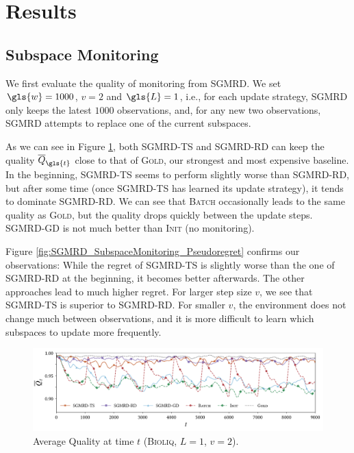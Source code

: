 \section{Results}

\subsection{Subspace Monitoring}

We first evaluate the quality of monitoring from \gls{SGMRD}. We set $\gls{w}=1000$, $v=2$ and $\gls{L}=1$, i.e., for each update strategy, \gls{SGMRD} only keeps the latest $1000$ observations, and, for any new two observations, 
\gls{SGMRD} attempts to replace one of the current subspaces. 

As we can see in Figure \ref{fig:SGMRD_SubspaceMonitoring_Quality}, both \textsc{\gls{SGMRD}-\gls{TS}} and \textsc{\gls{SGMRD}-RD} can keep the quality $\overline{Q}_{\gls{t}}$ close to that of \textsc{Gold}, our strongest and most expensive baseline. 
In the beginning, \textsc{\gls{SGMRD}-\gls{TS}} seems to perform slightly worse than \textsc{\gls{SGMRD}-RD}, but after some time (once \textsc{\gls{SGMRD}-\gls{TS}} has learned its update strategy), it tends to dominate \textsc{\gls{SGMRD}-RD}. 
We can see that \textsc{Batch} occasionally leads to the same quality as \textsc{Gold}, but the quality drops quickly between the update steps. 
\textsc{\gls{SGMRD}-GD} is not much better than \textsc{Init} (no monitoring). 

Figure \ref{fig:SGMRD_SubspaceMonitoring_Pseudoregret} confirms our observations: While the regret of \textsc{\gls{SGMRD}-\gls{TS}} is slightly worse than the one of \textsc{\gls{SGMRD}-RD} at the beginning, it becomes better afterwards. 
The other approaches lead to much higher regret. 
For larger step size $v$, we see that \textsc{\gls{SGMRD}-\gls{TS}} is superior to \textsc{\gls{SGMRD}-RD}. %
For smaller $v$, the environment does not change much between observations, and it is more difficult to learn which subspaces to update more frequently. 

\begin{figure}
	\includegraphics[width=\linewidth]{part4-figures/pyro_avgcontrast_step2_S_b_2-compressed.pdf}
	\caption{Average Quality at time $t$ (\textsc{Bioliq}, ${L}=1$, $v = 2$).} 
	\label{fig:SGMRD_SubspaceMonitoring_Quality}
\end{figure}

